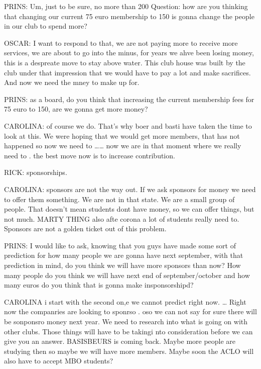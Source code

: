 \documentclass[12pt, a4paper]{article}
\begin{document}
PRINS: Um, just to be sure, no more than 200%
Question: how are you thinking that changing our current 75 euro membership to 150 is gonna change the people in our club to spend more?

OSCAR: I want to respond to that, we are not paying more to receive more services, we are about to go into the minus, for years we ahve been losing money, this is  a despreate move to stay above water. This club house was built by the club under that impression that we would have to pay a lot and make sacrifices. And now we need the mney to make up for. 

PRINS: as a board, do you think that increasing the current membership fees for 75 euro to 150, are we gonna get more money?

CAROLINA: of course we do. That's why boer and basti have taken the time to look at this. We were hoping that we would get more members, that has not happened so now we need to …… now we are in that moment where we really need to . the best move now is to increase contribution. 

RICK: sponsorships. 

CAROLINA: sponsors are not the way out. If we ask sponsors for money we need to offer them something. We are not in that state. We are a small group of people. That doesn't mean students dont have money, so we can offer things, but not much. MARTY THING also afte corona a lot of students really need to. Sponsors are not a golden ticket out of this problem.

PRINS: I would like to ask, knowing that you guys have made some sort of prediction for how many people we are gonna have next september, with that prediction in mind, do you think we will have more sponsors than now? How many people do you think we will have next end of september/october and how many euros do you think that is gonna make insponsorshipd?

CAROLINA i start with the second on,e we cannot predict right now. … Right now the companries are looking to sponrso . oso we can not say for sure there will be  sonponsro money next year. We need to research into what is going on with other clubs. Those things will have to be takingi nto consideration before we can give you an answer. BASISBEURS is coming back. Maybe more people are studying then so maybe we will have more members. Maybe soon the ACLO will also have to accept MBO students?
\end{document}
